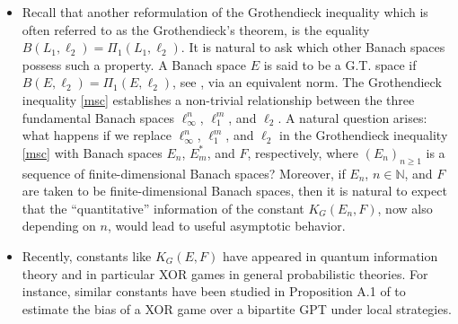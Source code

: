 \documentclass[a4paper,oneside,11pt, reqno]{amsart}
\numberwithin{equation}{section}
\theoremstyle{plain}
\begin{document}
\begin{itemize}[leftmargin=\dimexpr 30pt]
    \item Recall that another reformulation of the Grothendieck inequality which is often referred to as the Grothendieck's theorem, is the equality $B(L_1,\ell_2) = \Pi_1(L_1,\ell_2)$. It is natural to ask which other Banach spaces possess such a property. 
A Banach space $E$ is said to be a G.T. space if $B(E,\ell_2) = \Pi_1(E,\ell_2)$, see \cite{Pisier-factorization}, via an equivalent norm.
The Grothendieck inequality \eqref{msc} establishes a non-trivial relationship between the three fundamental Banach spaces $\ell_\infty^n$, $\ell_1^m$, and $\ell_2$. A natural question arises: what happens if we replace $\ell_\infty^n$, $\ell_1^m$, and $\ell_2$ in the Grothendieck inequality \eqref{msc} with Banach spaces $E_n$, $E_m^*$, and $F$, respectively, where $(E_n)_{n \geqslant 1}$ is a sequence of finite-dimensional Banach spaces? Moreover, if $E_n$, $n\in\mathbb N$, and $F$  are taken to be finite-dimensional Banach spaces, then it is natural to expect that the ``quantitative'' information of the constant $K_G(E_n,F)$, now also depending on $n$, would lead to useful asymptotic behavior. 
    
    \item Recently, constants like $K_G(E,F)$ have appeared in quantum information theory and in particular XOR games in general probabilistic theories. For instance, similar constants have been studied in Proposition A.1 of \cite{XOR games and GT} to estimate the bias of a XOR game over a bipartite GPT under local strategies.
    
   

\end{itemize}
\end{document}
